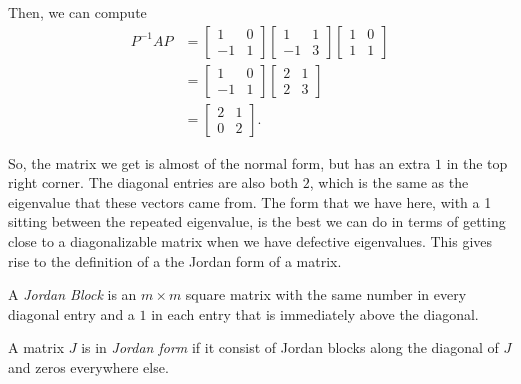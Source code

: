 \documentclass{ximera}
\begin{document}
\begin{exampleSol}
    Then, we can compute 
    \[ 
        \begin{split}
            P^{-1}AP &= 
            \begin{bmatrix} 
                1 & 0 \\ 
                -1 & 1 
            \end{bmatrix}
            \begin{bmatrix} 
                1 & 1 \\ 
                -1 & 3 
            \end{bmatrix}
            \begin{bmatrix} 
                1 & 0 \\ 
                1 & 1 
            \end{bmatrix} \\
            &= 
            \begin{bmatrix} 
                1 & 0 \\ 
                -1 & 1 
            \end{bmatrix}
            \begin{bmatrix} 
                2 & 1 \\ 
                2 & 3 
            \end{bmatrix} \\
            &= 
            \begin{bmatrix} 
                2 & 1 \\ 
                0 & 2 
            \end{bmatrix}.
        \end{split}
    \]
\end{exampleSol}

So, the matrix we get is almost of the normal form, but has an extra $1$ in the top right corner. The diagonal entries are also both $2$, which is the same as the eigenvalue that these vectors came from. The form that we have here, with a 1 sitting between the repeated eigenvalue, is the best we can do in terms of getting close to a diagonalizable matrix when we have defective eigenvalues. This gives rise to the definition of a the Jordan form of a matrix.

\begin{definition}
    A \emph{Jordan Block} is an $m \times m$ square matrix with the same number in every diagonal entry and a $1$ in each entry that is immediately above the diagonal. 
    
    A matrix $J$ is in \emph{Jordan form} if it consist of Jordan blocks along the diagonal of $J$ and zeros everywhere else.
\end{definition}
\end{document}
